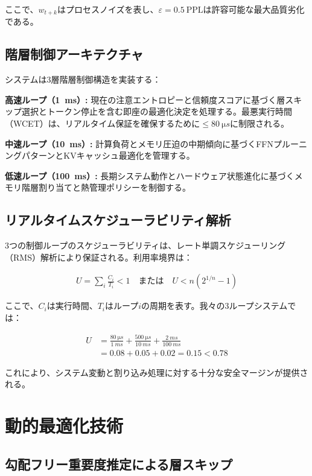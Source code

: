 \documentclass[10pt,twocolumn,a4paper]{jarticle}
\newcommand{\ppl}{\mathrm{PPL}}
\begin{document}
ここで、$w_{t+k}$はプロセスノイズを表し、$\varepsilon = \SI{0.5}{\ppl}$は許容可能な最大品質劣化である。

\subsection{階層制御アーキテクチャ}

システムは3層階層制御構造を実装する：

\textbf{高速ループ（\SI{1}{ms}）:} 現在の注意エントロピーと信頼度スコアに基づく層スキップ選択とトークン停止を含む即座の最適化決定を処理する。最悪実行時間（WCET）は、リアルタイム保証を確保するために$\leq \SI{80}{\micro s}$に制限される。

\textbf{中速ループ（\SI{10}{ms}）:} 計算負荷とメモリ圧迫の中期傾向に基づくFFNプルーニングパターンとKVキャッシュ最適化を管理する。

\textbf{低速ループ（\SI{100}{ms}）:} 長期システム動作とハードウェア状態進化に基づくメモリ階層割り当てと熱管理ポリシーを制御する。

\subsection{リアルタイムスケジューラビリティ解析}

3つの制御ループのスケジューラビリティは、レート単調スケジューリング（RMS）解析により保証される。利用率境界は：

\begin{align}
U = \sum_{i} \frac{C_i}{T_i} < 1 \quad \text{または} \quad U < n(2^{1/n} - 1) \label{eq:rms}
\end{align}

ここで、$C_i$は実行時間、$T_i$はループ$i$の周期を表す。我々の3ループシステムでは：

\begin{align}
U &= \frac{\SI{80}{\micro s}}{\SI{1}{ms}} + \frac{\SI{500}{\micro s}}{\SI{10}{ms}} + \frac{\SI{2}{ms}}{\SI{100}{ms}} \nonumber \\
&= 0.08 + 0.05 + 0.02 = 0.15 < 0.78 \label{eq:utilization}
\end{align}

これにより、システム変動と割り込み処理に対する十分な安全マージンが提供される。

\section{動的最適化技術}

\subsection{勾配フリー重要度推定による層スキップ}
\end{document}
